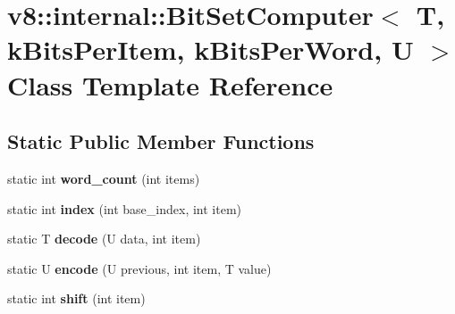 \hypertarget{classv8_1_1internal_1_1_bit_set_computer}{}\section{v8\+:\+:internal\+:\+:Bit\+Set\+Computer$<$ T, k\+Bits\+Per\+Item, k\+Bits\+Per\+Word, U $>$ Class Template Reference}
\label{classv8_1_1internal_1_1_bit_set_computer}
\subsection*{Static Public Member Functions}
\begin{DoxyCompactItemize}
\item 
static int {\bfseries word\+\_\+count} (int items)\hypertarget{classv8_1_1internal_1_1_bit_set_computer_a510fc37b902e73b5cbbe471ab6ce2c15}{}\label{classv8_1_1internal_1_1_bit_set_computer_a510fc37b902e73b5cbbe471ab6ce2c15}

\item 
static int {\bfseries index} (int base\+\_\+index, int item)\hypertarget{classv8_1_1internal_1_1_bit_set_computer_a65f33303316c784bb461bca14603b379}{}\label{classv8_1_1internal_1_1_bit_set_computer_a65f33303316c784bb461bca14603b379}

\item 
static T {\bfseries decode} (U data, int item)\hypertarget{classv8_1_1internal_1_1_bit_set_computer_a6b1768318b19d71f2c8f90524c4a3c15}{}\label{classv8_1_1internal_1_1_bit_set_computer_a6b1768318b19d71f2c8f90524c4a3c15}

\item 
static U {\bfseries encode} (U previous, int item, T value)\hypertarget{classv8_1_1internal_1_1_bit_set_computer_a44fa109f0b4c0c7c13130ebd14708add}{}\label{classv8_1_1internal_1_1_bit_set_computer_a44fa109f0b4c0c7c13130ebd14708add}

\item 
static int {\bfseries shift} (int item)\hypertarget{classv8_1_1internal_1_1_bit_set_computer_ab63eae7e3c886f4a5194024e056bc561}{}\label{classv8_1_1internal_1_1_bit_set_computer_ab63eae7e3c886f4a5194024e056bc561}

\end{DoxyCompactItemize}
